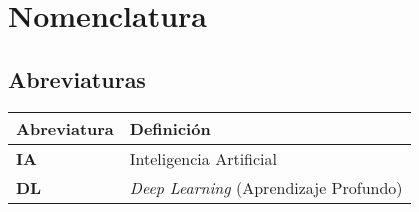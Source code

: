 \chapter*{Nomenclatura}

\section*{Abreviaturas}

\begin{longtable}{p{3cm}p{9cm}}
    \toprule
    \textbf{Abreviatura} & \textbf{Definición} \\
    \midrule\endhead %
    \textbf{IA} & Inteligencia Artificial \\
    \textbf{DL} & \textit{Deep Learning} (Aprendizaje Profundo) \\
    \bottomrule
\end{longtable}



